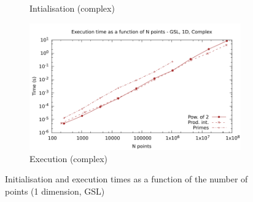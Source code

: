 \documentclass[12pt, a4paper]{article}
\begin{document}
\begin{figure}[htb]
\begin{subfigure}{.5\textwidth}
\caption{Intialisation (complex)}
\label{1DGSLCI}
\end{subfigure}%
\begin{subfigure}{.5\textwidth}
\centering
\includegraphics[width=.9\linewidth]{graphs/1d-gsl-exec-c.pdf}
\caption{Execution (complex)}
\label{1DGSLC}
\end{subfigure}
\caption{Initialisation and execution times as a function of the number of points (1 dimension, GSL)}
\label{1DGSL}
\end{figure}
\end{document}
